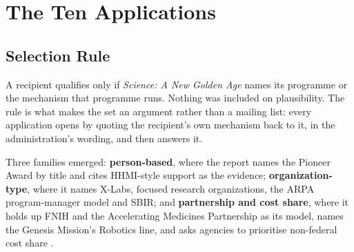 \section{The Ten Applications}

\subsection{Selection Rule}

A recipient qualifies only if \textit{Science: A New Golden Age} names its
programme or the mechanism that programme runs. Nothing was included on
plausibility. The rule is what makes the set an argument rather than a mailing
list: every application opens by quoting the recipient's own mechanism back to
it, in the administration's wording, and then answers it.

Three families emerged: \textbf{person-based}, where the report names the
Pioneer Award by title and cites HHMI-style support as the evidence;
\textbf{organization-type}, where it names X-Labs, focused research
organizations, the ARPA program-manager model and SBIR; and
\textbf{partnership and cost share}, where it holds up FNIH and the Accelerating
Medicines Partnership as its model, names the Genesis Mission's Robotics line,
and asks agencies to prioritise non-federal cost share
\cite{kratsiosvought2026fy2028priorities}.


